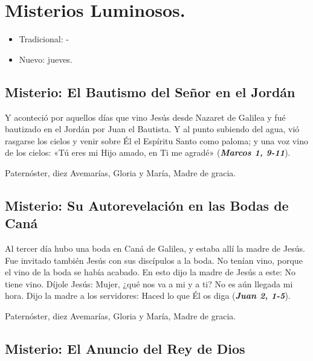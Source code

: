 \documentclass[./main.tex]{subfiles}
\newcounter{lux-counter}
\begin{document}
\section*{Misterios Luminosos.}
\begin{itemize}
      \item Tradicional: -
      \item Nuevo: jueves.
\end{itemize}

\subsection*{ Misterio: El Bautismo del Señor en el Jordán}

Y aconteció por aquellos días que vino Jesús desde Nazaret de Galilea y fué bautizado en el Jordán por Juan el Bautista. 
Y al punto subiendo del agua, vió rasgarse los cielos y venir sobre Él el Espíritu Santo como paloma; 
y una voz vino de los cielos: «Tú eres mi Hijo amado, en Ti me agradé» (\textbf{\emph{Marcos 1, 9-11}}).

\begin{center}
      Paternóster, diez Avemarías, Gloria y María, Madre de gracia.
\end{center}

\subsection*{ Misterio: Su Autorevelación en las Bodas de Caná}

Al tercer día hubo una boda en Caná de Galilea, y estaba allí la madre de Jesús. Fue invitado también Jesús con sus discípulos a la boda. 
No tenían vino, porque el vino de la boda se había acabado. En esto dijo la madre de Jesús a este: No tiene vino. 
Díjole Jesús: Mujer, ¿qué nos va a mi y a ti? No es aún llegada mi hora. Dijo la madre a los servidores: Haced lo que Él os diga (\textbf{\emph{Juan 2, 1-5}}).

\begin{center}
      Paternóster, diez Avemarías, Gloria y María, Madre de gracia.
\end{center}

\subsection*{ Misterio: El Anuncio del Rey de Dios}
\end{document}
